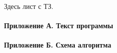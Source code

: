 \documentclass[12pt, a4paper, simple]{eskdtext}
\begin{document}
    \begin{ESKDtitlePage}
        
    \end{ESKDtitlePage}

    Здесь лист с ТЗ.
    \newpage

    \tableofcontents
    \paragraph{Приложение А. Текст программы}
    \paragraph{Приложение Б. Схема алгоритма}
    \newpage

     \newpage
     \newpage
     \newpage
     \newpage
     \newpage
     \newpage
     \newpage
    
\end{document}
